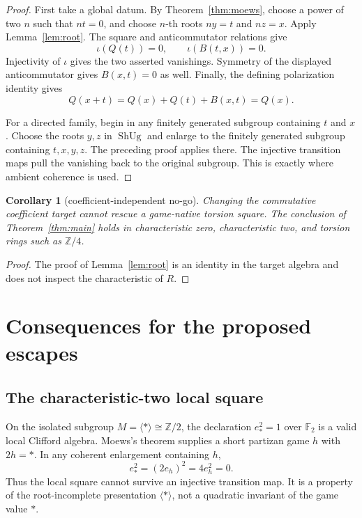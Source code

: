 \documentclass[11pt]{article}
\newtheorem{corollary}[theorem]{Corollary}
\theoremstyle{definition}
\theoremstyle{remark}
\newcommand{\Z}{\mathbb Z}
\newcommand{\F}{\mathbb F}
\newcommand{\ShUg}{\operatorname{ShUg}}
\begin{document}
\begin{proof}
First take a global datum.  By Theorem~\ref{thm:moews}, choose a power of two
$n$ such that $nt=0$, and choose $n$-th roots $ny=t$ and $nz=x$.  Apply
Lemma~\ref{lem:root}.  The square and anticommutator relations give
\[
 \iota(Q(t))=0,
 \qquad
 \iota(B(t,x))=0.
\]
Injectivity of $\iota$ gives the two asserted vanishings.  Symmetry of the
displayed anticommutator gives $B(x,t)=0$ as well.  Finally, the defining
polarization identity gives
\[
 Q(x+t)=Q(x)+Q(t)+B(x,t)=Q(x).
\]

For a directed family, begin in any finitely generated subgroup containing
$t$ and $x$.  Choose the roots $y,z$ in $\ShUg$ and enlarge to the finitely
generated subgroup containing $t,x,y,z$.  The preceding proof applies there.
The injective transition maps pull the vanishing back to the original
subgroup.  This is exactly where ambient coherence is used.
\end{proof}

\begin{corollary}[coefficient-independent no-go]\label{cor:coeff}
Changing the commutative coefficient target cannot rescue a
game-native torsion square.  The conclusion of Theorem~\ref{thm:main} holds in
characteristic zero, characteristic two, and torsion rings such as $\Z/4$.
\end{corollary}

\begin{proof}
The proof of Lemma~\ref{lem:root} is an identity in the target algebra and
does not inspect the characteristic of $R$.
\end{proof}

\section{Consequences for the proposed escapes}

\subsection{The characteristic-two local square}

On the isolated subgroup $M=\langle *\rangle\cong\Z/2$, the declaration
$e_*^2=1$ over $\F_2$ is a valid local Clifford algebra.  Moews's theorem
supplies a short partizan game $h$ with $2h=*$.  In any coherent enlargement
containing $h$,
\[
 e_*^2=(2e_h)^2=4e_h^2=0.
\]
Thus the local square cannot survive an injective transition map.  It is a
property of the root-incomplete presentation $\langle *\rangle$, not a
quadratic invariant of the game value $*$.
\end{document}
